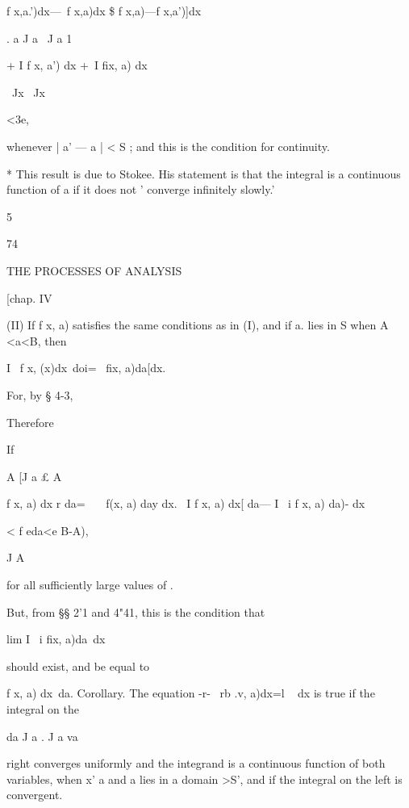 f x,a.')dx—\ f x,a)dx \$  f x,a)—f x,a')]dx\ 

. a J a \ J a 1 

+ I f x, a') dx +\ I fix, a) dx 

\ Jx \ Jx 

<3e, 

whenever | a' — a | < S ; and this is the condition for continuity. 

* This result is due to Stokee. His statement is that the integral is a continuous function 
of a if it does not ' converge infinitely slowly.' 



5  



74 



THE PROCESSES OF ANALYSIS 



[chap. IV 



(II) If f  x, a) satisfies the same conditions as in (I), and if a. lies in S 
when A <a<B, then 



I \ f x, (x)dx\ doi= \ fix, a)da[dx. 



For, by § 4-3, 



Therefore 



If 

A [J a 
£ 
A 



f x, a) dx r da= \ \ \ f(x, a) day dx. 
\ I f x, a) dx[ da— I \ i f x, a) da)- dx 

< f eda<e B-A), 

J A 



for all sufficiently large values of  . 

But, from §§ 2'1 and 4"41, this is the condition that 



lim I \ i fix, a)da\ dx 



should exist, and be equal to 



f x, a) dx\ da. 
Corollary. The equation -r- \ rb .v, a)dx=l ~ dx is true if the integral on the 

da J a . J a va 

right converges uniformly and the integrand is a continuous function of both variables, 
when x' a and a lies in a domain >S', and if the integral on the left is convergent. 


